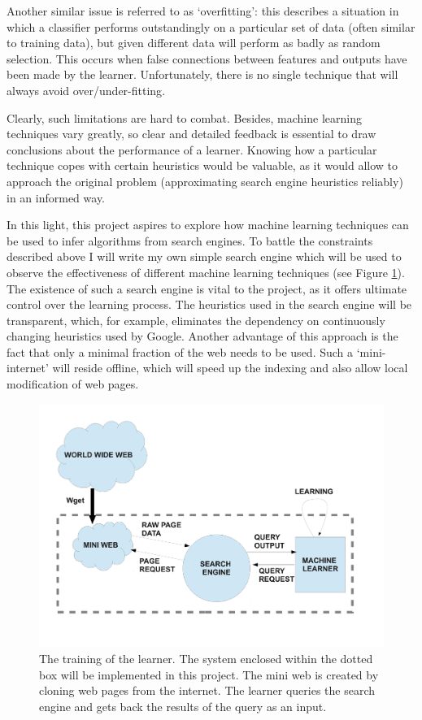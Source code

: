 Another similar issue is referred to as `overfitting': this describes a situation in which a classifier performs outstandingly on a particular set of data (often similar to training data), but given different data will perform as badly as random selection. This occurs when false connections between features and outputs have been made by the learner. Unfortunately, there is no single technique that will always avoid over/under-fitting\cite{domingos}.

Clearly, such limitations are hard to combat. Besides, machine learning techniques vary greatly, so clear and detailed feedback is essential to draw conclusions about the performance of a learner. Knowing how a particular technique copes with certain heuristics would be valuable, as it would allow to approach the original problem (approximating search engine heuristics reliably) in an informed way.  

In this light, this project aspires to explore how machine learning techniques can be used to infer algorithms from search engines. To battle the constraints described above I will write my own simple search engine which will be used to observe the effectiveness of different machine learning techniques (see Figure \ref{diag1}). The existence of such a search engine is vital to the project, as it offers ultimate control over the learning process. The heuristics used in the search engine will be transparent, which, for example, eliminates the dependency on continuously changing heuristics used by Google. Another advantage of this approach is the fact that only a minimal fraction of the web needs to be used. Such a `mini-internet' will reside offline, which will speed up the indexing and also allow local modification of web pages. 

\begin{figure}
\centering
\includegraphics[scale=0.5]{diagram1}
\caption{The training of the learner. The system enclosed within the dotted box will be implemented in this project. The mini web is created by cloning web pages from the internet. The learner queries the search engine and gets back the results of the query as an input. }
\label{diag1}
\end{figure}


